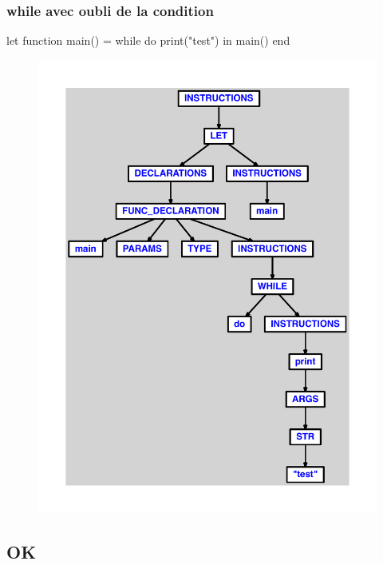 \documentclass{article}
\begin{document}
\subsubsection{while avec oubli de la condition}
\begin{verbatimtab}
let
	function main() =
		while do
			print("test")
in main() end
\end{verbatimtab}
\begin{figure}[H]\centering\includegraphics[max width=\textwidth]{ast/ast_319.pdf}\end{figure}\subsection{OK}
\end{document}
